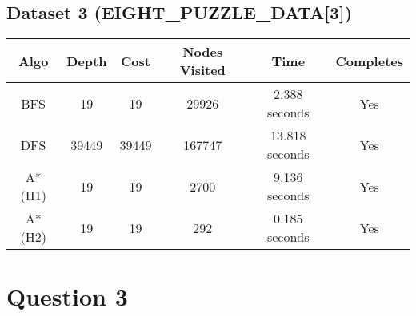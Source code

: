 \documentclass[fleqn, 12pt]{article}
\begin{document}
\subsection*{Dataset 3 (EIGHT\_PUZZLE\_DATA[3])}

\begin{tabular}{|c|c|c|c|c|c|}
    \hline
        Algo & Depth & Cost & Nodes Visited & Time & Completes  \\\hline
        BFS  & 19 & 19 & 29926 & 2.388 seconds & Yes \\\hline
        DFS  & 39449 & 39449 & 167747 & 13.818 seconds & Yes \\\hline
        A* (H1)  & 19 & 19 & 2700 & 9.136 seconds & Yes \\\hline
        A* (H2)  & 19 & 19 & 292 & 0.185 seconds & Yes \\
    \hline
\end{tabular}

\section*{Question 3}
\end{document}
